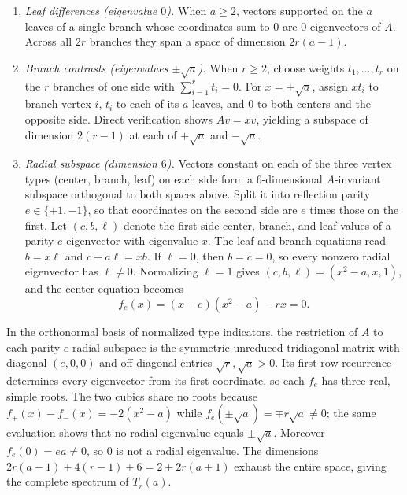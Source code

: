 \documentclass[11pt]{article}
\theoremstyle{plain}
\theoremstyle{remark}
\begin{document}
\begin{enumerate}
\item \emph{Leaf differences (eigenvalue $0$).} When $a \geq 2$, vectors
  supported on the $a$ leaves of a single branch whose coordinates sum to $0$
  are $0$-eigenvectors of $A$. Across all $2r$ branches they span a space of
  dimension $2r(a-1)$.

\item \emph{Branch contrasts (eigenvalues $\pm\sqrt{a}$).} When $r \geq 2$,
  choose weights $t_1,\dots,t_r$ on the $r$ branches of one side with
  $\sum_{i=1}^r t_i = 0$. For $x = \pm\sqrt{a}$, assign $x t_i$ to branch
  vertex $i$, $t_i$ to each of its $a$ leaves, and $0$ to both centers and the
  opposite side. Direct verification shows $A v = x v$, yielding a subspace of
  dimension $2(r-1)$ at each of $+\sqrt{a}$ and $-\sqrt{a}$.

\item \emph{Radial subspace (dimension $6$).} Vectors constant on each of the
  three vertex types (center, branch, leaf) on each side form a
  $6$-dimensional $A$-invariant subspace orthogonal to both spaces above. Split
  it into reflection parity $e \in \{+1,-1\}$, so that coordinates on the second
  side are $e$ times those on the first. Let $(c, b, \ell)$ denote the
  first-side center, branch, and leaf values of a parity-$e$ eigenvector with
  eigenvalue $x$. The leaf and branch equations read $b = x\ell$ and
  $c + a\ell = xb$. If $\ell = 0$, then $b = c = 0$, so every nonzero radial
  eigenvector has $\ell \neq 0$. Normalizing $\ell = 1$ gives
  $(c, b, \ell) = (x^2-a, x, 1)$, and the center equation becomes
  \begin{equation}\label{eq:fe}
    f_e(x) = (x-e)(x^2-a) - rx = 0.
  \end{equation}
\end{enumerate}

In the orthonormal basis of normalized type indicators, the restriction of $A$
to each parity-$e$ radial subspace is the symmetric unreduced tridiagonal
matrix with diagonal $(e,0,0)$ and off-diagonal entries $\sqrt{r},\sqrt{a} > 0$.
Its first-row recurrence determines every eigenvector from its first coordinate,
so each $f_e$ has three real, simple roots. The two cubics share no roots
because $f_+(x) - f_-(x) = -2(x^2-a)$ while
$f_e(\pm\sqrt{a}) = \mp r\sqrt{a} \neq 0$; the same evaluation shows that no
radial eigenvalue equals $\pm\sqrt{a}$. Moreover $f_e(0) = ea \neq 0$, so $0$
is not a radial eigenvalue. The dimensions
$2r(a-1) + 4(r-1) + 6 = 2 + 2r(a+1)$ exhaust the entire space, giving the
complete spectrum of $T_r(a)$.
\end{document}
